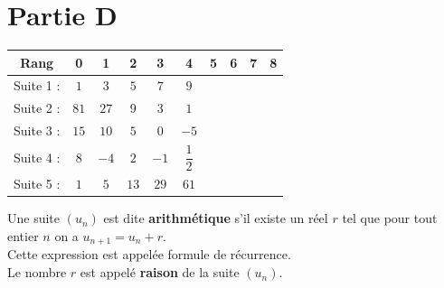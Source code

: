 \documentclass[a4paper,11pt,exos]{nsi} %
\begin{document}
\maketitle
\section*{Partie D}

\renewcommand{\arraystretch}{1.6}
\begin{tabular}{|c|c|c|c|c|c|c|c|c|c|}
	\hline
	\rowcolor{UGLiOrange}Rang & \hspace{0.5cm}0\hspace{0.5cm} & \hspace{0.5cm}1\hspace{0.5cm} & \hspace{0.5cm}2\hspace{0.5cm} & \hspace{0.5cm}3\hspace{0.5cm} & \hspace{0.5cm}4\hspace{0.5cm} & \hspace{0.5cm}5\hspace{0.5cm} & \hspace{0.5cm}6\hspace{0.5cm} & \hspace{0.5cm}7\hspace{0.5cm} & \hspace{0.5cm}8\hspace{0.5cm}  \\
	\hline
	\cellcolor{UGLiOrange}Suite 1 : & $1$ & $3$ & $5$ & $7$ & $9$ & & & & \\
	\hline
	\cellcolor{UGLiOrange}Suite 2 : & $81$ & $27$ & $9$ & $3$ & $1$ & & & & \\
	\hline
	\cellcolor{UGLiOrange}Suite 3 : & $15$ & $10$ & $5$ & $0$ & $-5$ & & & & \\
	\hline
	\cellcolor{UGLiOrange}Suite 4 : & $8$ & $-4$ & $2$ & $-1$ & $\dfrac{1}{2}$ & & & & \\
	\hline
	\cellcolor{UGLiOrange}Suite 5 : & $1$ & $5$ & $13$ & $29$ & $61$ & & & & \\
	\hline
\end{tabular}


\begin{definition}[]
	Une suite $(u_n)$ est dite \textbf{arithmétique} s'il existe un réel $r$ tel que pour tout entier $n$ on a  $u_{n+1}=u_n+r$.\\
	Cette expression est appelée formule de récurrence.\\
	Le nombre $r$ est appelé \textbf{raison} de la suite $(u_n)$.
\end{definition}
\end{document}
